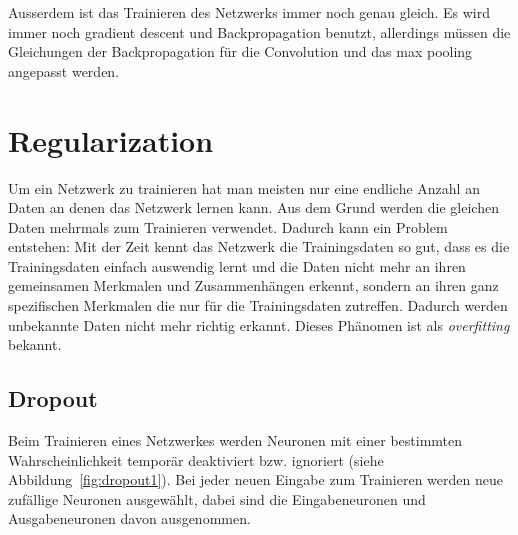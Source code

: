 \documentclass[12pt,a4paper]{report}
\begin{document}
Ausserdem ist das Trainieren des Netzwerks immer noch genau gleich.
Es wird immer noch gradient descent und Backpropagation benutzt,
allerdings müssen die Gleichungen der Backpropagation für die Convolution und das max pooling angepasst werden.

\section{Regularization}
Um ein Netzwerk zu trainieren hat man meisten nur eine endliche Anzahl an Daten an denen das Netzwerk lernen kann.
Aus dem Grund werden die gleichen Daten mehrmals zum Trainieren verwendet.
Dadurch kann ein Problem entstehen:
Mit der Zeit kennt das Netzwerk die Trainingsdaten so gut, dass es die Trainingsdaten einfach auswendig lernt
und die Daten nicht mehr an ihren gemeinsamen Merkmalen und Zusammenhängen erkennt,
sondern an ihren ganz spezifischen Merkmalen die nur für die Trainingsdaten zutreffen.
Dadurch werden unbekannte Daten nicht mehr richtig erkannt.
Dieses Phänomen ist als \textit{overfitting} bekannt.
\subsection{Dropout}
Beim Trainieren eines Netzwerkes werden Neuronen mit einer bestimmten Wahrscheinlichkeit temporär deaktiviert bzw. ignoriert (siehe Abbildung~\ref{fig:dropout1}).
Bei jeder neuen Eingabe zum Trainieren werden neue zufällige Neuronen ausgewählt,
dabei sind die Eingabeneuronen und Ausgabeneuronen davon ausgenommen.
\end{document}
